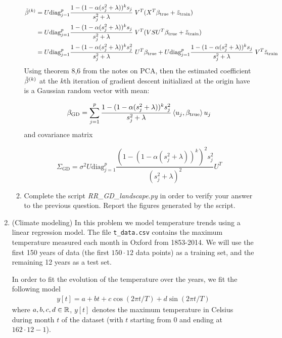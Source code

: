 \documentclass[12pt,twoside]{article}
\begin{document}
\begin{enumerate}
\begin{enumerate}
\begin{align*}
	\tilde{ \beta }^{\left( k \right)} &=  U  \text{diag}_{j=1}^p \frac{ 1 - ( 1 - \alpha (s_j^2 + \lambda))^{k} s_j}{s_j^2 + \lambda}  \;  V^T (X^T \beta_{\operatorname{true}} + \tilde{ z }_{\operatorname{train}} )\\
					&=  U  \text{diag}_{j=1}^p \frac{ 1 - ( 1 - \alpha (s_j^2 + \lambda))^{k} s_j}{s_j^2 + \lambda}  \;  V^T (V S U^T \beta_{\operatorname{true}} + \tilde{ z }_{\operatorname{train}} )\\
					&=  U  \text{diag}_{j=1}^p \frac{ 1 - ( 1 - \alpha (s_j^2 + \lambda))^{k} s_j^2}{s_j^2 + \lambda}  \; U^T \beta_{\operatorname{true}} 
					+      U  \text{diag}_{j=1}^p \frac{ 1 - ( 1 - \alpha (s_j^2 + \lambda))^{k} s_j}{s_j^2 + \lambda}  \;  V^T  \tilde{ z }_{\operatorname{train}} \\
\end{align*}
Using theorem 8,6 from the notes on PCA, then  the estimated coefficient $\tilde{ \beta }^{\left( k \right)}$ at the $k$th iteration of gradient descent initialized at the origin have is a Gaussian random vector  with mean:

$$ \beta_{\text{GD}}  = \sum_{j=1}^p  \frac{ 1 - ( 1 - \alpha (s_j^2 + \lambda))^{k} s_j^2}{s_j^2 + \lambda}  \left \langle u_j, \beta_{\operatorname{true}}\right \rangle u_j $$
and covariance matrix

$$ \Sigma_{\text{GD}} = \sigma^2 U  \text{diag}_{j=1}^p \frac{ (1 - ( 1 - \alpha (s_j^2 + \lambda))^{k})^2 s_j^2}{(s_j^2 + \lambda)^2}  U^T $$

\item Complete the script \emph{RR\_GD\_landscape.py} in order to verify your answer to the previous question. Report the figures generated by the script.
\end{enumerate}
 
\newpage

\item  (Climate modeling) In this problem we model temperature trends using a linear regression model. The file 
\texttt{t\_data.csv} contains the maximum temperature measured
  each month in Oxford from 1853-2014.  We will use the first
  150 years of data (the first $150\cdot 12$ data points) as a training set, and
  the remaining 12 years as a test set.

 In order to fit the evolution of the temperature over the years, we fit the following model
  \begin{align}
  y[t] = a + bt + c \cos(2\pi t/T) + d\sin(2\pi  t/T)
  \end{align}
  where $a,b,c,d\in\mathbb{R}$, $y[t]$ denotes the maximum temperature in Celsius during month $t$ of the dataset (with $t$ starting from $0$ and ending at $162\cdot 12-1$).
   

\end{enumerate}
\end{document}
